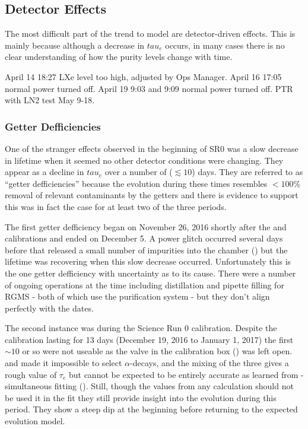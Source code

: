 \subsection{Detector Effects}
\label{subsec:electron_lifetime_model_detector_effects}
The most difficult part of the trend to model are detector-driven effects.  This is mainly because although a decrease in $tau_e$ occurs,
in many cases there is no clear understanding of how the purity levels change with time.

April 14 18:27 LXe level too high, adjusted by Ops Manager.  April 16 17:05 normal power turned off.  April 19 9:03 and 9:09 normal power
turned off.  PTR with LN2 test May 9-18.



\subsubsection{Getter Defficiencies}
\label{subsubsec:electron_lifetime_model_detector_effects_getter}
One of the stranger effects observed in the beginning of SR0 was a slow decrease in lifetime when it seemed no other detector conditions
were changing.  They
appear as a decline in $tau_e$ over a number of ($\lesssim 10$) days.  They are referred to as ``getter defficiencies'' because the
evolution during these times resembles $< 100\%$ removal of relevant
contaminants by the getters and there is evidence to support this was in fact the case for at least two of the three periods.

The first getter defficiency
began on November 26, 2016 shortly after the \ambe and \metakr calibrations and ended on December 5.  A power glitch occurred several
days before that released a small number of impurities into the chamber
() but the lifetime was recovering when this slow decrease
occurred.  Unfortunately this is the one getter defficiency with uncertainty as to its cause.  There were a number of ongoing operations
at the time including  distillation and pipette filling for RGMS - both of which use the purification system - but they don't
align perfectly with the dates.

The second instance was during the Science Run 0 \rncal calibration.  Despite the calibration lasting for 13 days (December 19, 2016 to
January 1, 2017) the first ${\sim} 10$ or
so were not useable as the valve in the calibration box () was left
open.  \rncal and  made it impossible to select  $\alpha$-decays, and the mixing of the three gives a rough
value of $\tau_e$ but cannot be expected to be entirely accurate as learned from \rnbkg- simultaneous fitting
().  Still, though the values from any calculation should not be used it in the
fit they still provide insight into the evolution during this period.  They show a steep dip at the beginning before returning to the
expected evolution model.

